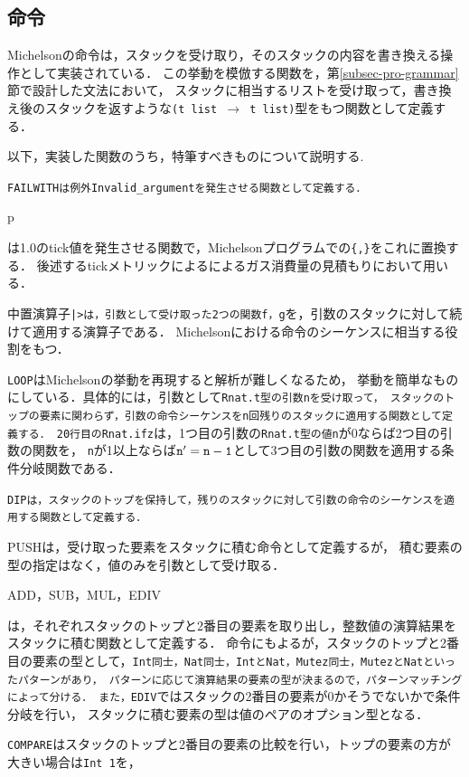 \documentclass{kuisthesis}
\begin{document}
\subsection{命令} \label{subsec-pro-instr}
Michelsonの命令は，スタックを受け取り，そのスタックの内容を書き換える操作として実装されている．
この挙動を模倣する関数を，第\ref{subsec-pro-grammar}節で設計した文法において，
スタックに相当するリストを受け取って，書き換え後のスタックを返すような{\tt (t list $\rightarrow$ t list)}型をもつ関数として定義する．


以下，実装した関数のうち，特筆すべきものについて説明する.
\begin{itemize}
  \item {\tt FAILWITHは例外Invalid\_argumentを発生させる関数として定義する．
  \item p}は1.0のtick値を発生させる関数で，Michelsonプログラムでの{\tt \{,\}}をこれに置換する．
  後述するtickメトリックによるによるガス消費量の見積もりにおいて用いる．
  \item 中置演算子{\tt |>は，引数として受け取った2つの関数f，g}を，引数のスタックに対して続けて適用する演算子である．
  Michelsonにおける命令のシーケンスに相当する役割をもつ．
  \item {\tt LOOP}はMichelsonの挙動を再現すると解析が難しくなるため，
  挙動を簡単なものにしている．具体的には，引数として{\tt Rnat.t型の引数nを受け取って，
  スタックのトップの要素に関わらず，引数の命令シーケンスをn回残りのスタックに適用する関数として定義する．
  20行目のRnat.ifz}は，1つ目の引数の{\tt Rnat.t型の値n}が0ならば2つ目の引数の関数を，
  {\tt n}が1以上ならば${\tt n'=n-1}$として3つ目の引数の関数を適用する条件分岐関数である．
  \item {\tt DIPは，スタックのトップを保持して，残りのスタックに対して引数の命令のシーケンスを適用する関数として定義する．
  \item PUSHは，受け取った要素をスタックに積む命令として定義するが，
  積む要素の型の指定はなく，値のみを引数として受け取る．
  \item ADD，SUB，MUL，EDIV}は，それぞれスタックのトップと2番目の要素を取り出し，整数値の演算結果をスタックに積む関数として定義する．
  命令にもよるが，スタックのトップと2番目の要素の型として，{\tt Int同士，Nat同士，IntとNat，Mutez同士，MutezとNatといったパターンがあり，
  パターンに応じて演算結果の要素の型が決まるので，パターンマッチングによって分ける．
  また，EDIV}ではスタックの2番目の要素が0かそうでないかで条件分岐を行い，
  スタックに積む要素の型は値のペアのオプション型となる．
  \item {\tt COMPARE}はスタックのトップと2番目の要素の比較を行い，トップの要素の方が大きい場合は{\tt Int 1}を，

\end{itemize}
\end{document}
